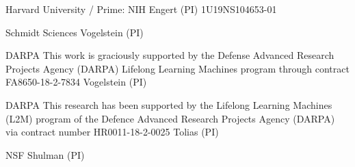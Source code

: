 \documentclass[10pt,colorlinks=true,urlcolor=blue]{moderncv}
\begin{document}
%
    {Harvard University / Prime: NIH}%
    {}%
    {Engert (PI) 1U19NS104653-01}{}


%
    {Schmidt Sciences}%
    {}%
    {Vogelstein (PI)}{}


%
    {DARPA}%
    {This work is graciously supported by the Defense Advanced Research Projects Agency (DARPA) Lifelong Learning Machines program through contract FA8650-18-2-7834}%
    {Vogelstein (PI)}{}


%
    {DARPA}%
    {This research has been supported by the Lifelong Learning Machines (L2M) program of the Defence Advanced Research Projects Agency (DARPA) via contract number HR0011-18-2-0025}%
    {Tolias (PI)}{}


%
    {NSF}%
    {}%
    {Shulman (PI)}{}
\end{document}
